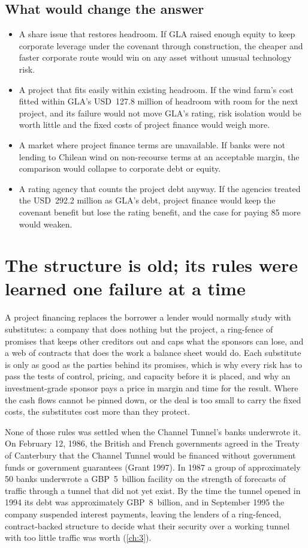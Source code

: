 \subsection*{What would change the answer}
\begin{itemize}
\item A share issue that restores headroom. If GLA raised enough equity to keep corporate leverage under the covenant through construction, the cheaper and faster corporate route would win on any asset without unusual technology risk.
\item A project that fits easily within existing headroom. If the wind farm's cost fitted within GLA's USD~127.8 million of headroom with room for the next project, and its failure would not move GLA's rating, risk isolation would be worth little and the fixed costs of project finance would weigh more.
\item A market where project finance terms are unavailable. If banks were not lending to Chilean wind on non-recourse terms at an acceptable margin, the comparison would collapse to corporate debt or equity.
\item A rating agency that counts the project debt anyway. If the agencies treated the USD~292.2 million as GLA's debt, project finance would keep the covenant benefit but lose the rating benefit, and the case for paying 85\bps{} more would weaken.
\end{itemize}

\section{The structure is old; its rules were learned one failure at a time}\label{sec:2.12}

A project financing replaces the borrower a lender would normally study with substitutes: a company that does nothing but the project, a ring-fence of promises that keeps other creditors out and caps what the sponsors can lose, and a web of contracts that does the work a balance sheet would do. Each substitute is only as good as the parties behind its promises, which is why every risk has to pass the tests of control, pricing, and capacity before it is placed, and why an investment-grade sponsor pays a price in margin and time for the result. Where the cash flows cannot be pinned down, or the deal is too small to carry the fixed costs, the substitutes cost more than they protect.

None of those rules was settled when the Channel Tunnel's banks underwrote it. On February 12, 1986, the British and French governments agreed in the Treaty of Canterbury that the Channel Tunnel would be financed without government funds or government guarantees (Grant 1997). In 1987 a group of approximately 50 banks underwrote a GBP~5~billion facility on the strength of forecasts of traffic through a tunnel that did not yet exist. By the time the tunnel opened in 1994 its debt was approximately GBP~8~billion, and in September 1995 the company suspended interest payments, leaving the lenders of a ring-fenced, contract-backed structure to decide what their security over a working tunnel with too little traffic was worth (\cref{ch:3}).

